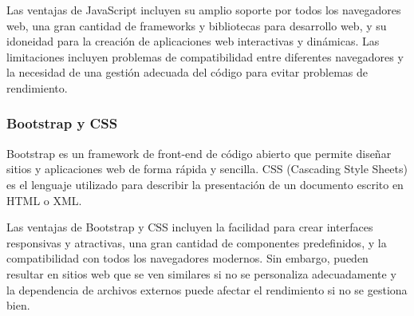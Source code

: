 Las ventajas de JavaScript incluyen su amplio soporte por todos los navegadores web, una gran cantidad de frameworks y bibliotecas para desarrollo web, y su idoneidad para la creación de aplicaciones web interactivas y dinámicas. Las limitaciones incluyen problemas de compatibilidad entre diferentes navegadores y la necesidad de una gestión adecuada del código para evitar problemas de rendimiento.

\subsubsection{Bootstrap y CSS}

Bootstrap es un framework de front-end de código abierto que permite diseñar sitios y aplicaciones web de forma rápida y sencilla. CSS (Cascading Style Sheets) es el lenguaje utilizado para describir la presentación de un documento escrito en HTML o XML.

Las ventajas de Bootstrap y CSS incluyen la facilidad para crear interfaces responsivas y atractivas, una gran cantidad de componentes predefinidos, y la compatibilidad con todos los navegadores modernos. Sin embargo, pueden resultar en sitios web que se ven similares si no se personaliza adecuadamente y la dependencia de archivos externos puede afectar el rendimiento si no se gestiona bien.